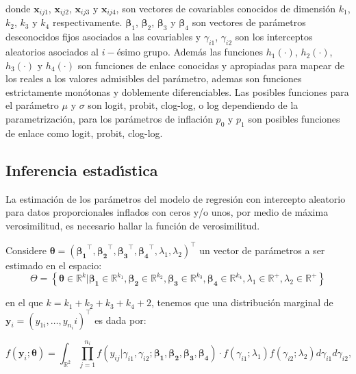 donde $\mathbf{x}_{ij1}$, $\mathbf{x}_{ij2}$, $\mathbf{x}_{ij3}$ y $\mathbf{x}_{ij4}$, son vectores de covariables conocidos de dimensi\'{o}n $k_1$, $k_2$, $k_3$ y $k_4$ respectivamente. $\boldsymbol{\beta}_1$, $\boldsymbol{\beta}_2$, $\boldsymbol{\beta}_3$ y $\boldsymbol{\beta}_4$ son vectores de par\'{a}metros desconocidos fijos asociados a las covariables y $\gamma_{i1}$, $\gamma_{i2}$ son los interceptos aleatorios asociados al $i-$\'{e}simo grupo. Adem\'{a}s las funciones $h_1(\cdot)$, $h_2(\cdot)$, $h_3(\cdot)$ y $h_4(\cdot)$ son funciones de enlace conocidas y apropiadas para mapear de los reales a los valores admisibles del par\'{a}metro, ademas son funciones estrictamente mon\'{o}tonas y doblemente diferenciables. Las posibles funciones para el par\'{a}metro $\mu$ y $\sigma$ son logit, probit, clog-log, o log dependiendo de la parametrizaci\'{o}n,  para los par\'{a}metros de inflaci\'{o}n $p_0$ y $p_1$ son posibles funciones de enlace como logit, probit, clog-log.

\subsection{Inferencia estad\'{\i}stica}

La estimaci\'{o}n de los par\'{a}metros del modelo de regresi\'{o}n con intercepto aleatorio para datos proporcionales inflados con ceros y/o unos, por medio de m\'{a}xima verosimilitud, es necesario hallar la funci\'{o}n de verosimilitud.

Considere $\boldsymbol{\theta}=(\boldsymbol{\beta_1}^{\top},\boldsymbol{\beta_2}^{\top},\boldsymbol{\beta_3}^{\top}, \boldsymbol{\beta_4}^{\top},\lambda_1,\lambda_2)^{\top}$ un vector de par\'{a}metros a ser estimado en el espacio:
\[
\Theta=\left\{\boldsymbol{\theta} \in \mathbb{R}^k | \boldsymbol{\beta_1} \in \mathbb{R}^{k_1}, \boldsymbol{\beta_2} \in \mathbb{R}^{k_2}, \boldsymbol{\beta_3} \in \mathbb{R}^{k_3}, \boldsymbol{\beta_4} \in \mathbb{R}^{k_4}, \lambda_1 \in \mathbb{R}^+, \lambda_2 \in \mathbb{R}^+  \right\}
\]

en el que $k=k_1+k_2+k_3+k_4+2$, tenemos que una distribuci\'{o}n marginal de $\mathbf{y}_i=(y_{1i},\ldots, y_{n_i}i)^{\top}$ es dada por:

\[
f(\mathbf{y}_i;\boldsymbol{\theta})=\int_{\mathbb{R}^2}\prod_{j=1}^{n_i}f(y_{ij}|\gamma_{i1},\gamma_{i2};\boldsymbol{\beta_1}, \boldsymbol{\beta_2}, \boldsymbol{\beta_3}, \boldsymbol{\beta_4})\cdot f(\gamma_{i1};\lambda_1) f(\gamma_{i2};\lambda_2) d\gamma_{i1}d\gamma_{i2},
\]

